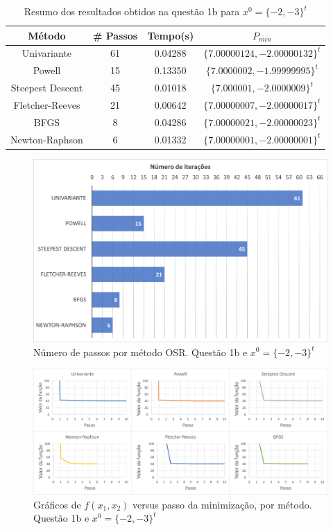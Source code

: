 \documentclass[10pt, a4paper]{article}
\begin{document}
\begin{table}[H]
  \begin{center}
    \begin{tabular}{c|c|c|c}
      \textbf{Método} & \textbf{\# Passos} & \textbf{Tempo(s)} & \textbf{$P_{min}$}\\
      \hline
      Univariante       & 61  & 0.04288 & $\{7.00000124, -2.00000132\}^t$\\
      Powell            & 15  & 0.13350 & $\{7.0000002, -1.99999995\}^t$\\
      Steepest Descent  & 45  & 0.01018 & $\{7.000001, -2.0000009\}^t$\\
      Fletcher-Reeves   & 21  & 0.00642 & $\{7.00000007, -2.00000017\}^t$\\
      BFGS              & 8   & 0.04286 & $\{7.00000021, -2.00000023\}^t$\\
      Newton-Raphson    & 6   & 0.01332 & $\{7.00000001, -2.00000001\}^t$\\
    \end{tabular}
  \end{center}
  \caption{Resumo dos resultados obtidos na questão 1b para $x^0 = \{-2,-3\}^t$}
\end{table}

\begin{figure}[H]
  \centering
  \includegraphics[scale=0.4]{figuras/q1b_passos_P2.PNG}
  \caption{Número de passos por método OSR. Questão 1b e $x^0 = \{-2,-3\}^t$ }
\end{figure}

\begin{figure}[H]
  \centering
  \includegraphics[scale=0.45]{figuras/q1b_fxpassos_P2.PNG}
  \caption{Gráficos de $f(x_1,x_2)$ versus passo da minimização, por método. Questão 1b e $x^0 = \{-2,-3\}^t$}
\end{figure}
\end{document}
